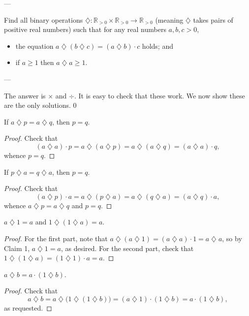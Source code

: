 
---

Find all binary operations $\mathbin{\diamondsuit}:\mathbb R_{>0}\times\mathbb R_{>0}\to\mathbb R_{>0}$ (meaning $\mathbin{\diamondsuit}$ takes pairs of positive real numbers) such that for any real numbers $a,b,c>0$,
\begin{itemize}[itemsep=0em]
    \item the equation $a\mathbin{\diamondsuit}(b\mathbin{\diamondsuit}c)=(a\mathbin{\diamondsuit}b)\cdot c$ holds; and
    \item if $a\ge 1$ then $a\mathbin{\diamondsuit}a\ge 1$.
\end{itemize}

---

The answer is $\times$ and $\div$. It is easy to check that these work. We now show these are the only solutions.
\setcounter{iclaim}0
\begin{iclaim}
    If $a\mathbin{\diamondsuit}p=a\mathbin{\diamondsuit}q$, then $p=q$.
\end{iclaim}
\begin{proof}
    Check that $$(a\mathbin{\diamondsuit}a)\cdot p=a\mathbin{\diamondsuit}(a\mathbin{\diamondsuit}p)=a\mathbin{\diamondsuit}(a\mathbin{\diamondsuit}q)=(a\mathbin{\diamondsuit}a)\cdot q,$$
    whence $p=q$.
\end{proof}
\begin{iclaim}
    If $p\mathbin{\diamondsuit}a=q\mathbin{\diamondsuit}a$, then $p=q$.
\end{iclaim}
\begin{proof}
    Check that $$(a\mathbin{\diamondsuit}p)\cdot a=a\mathbin{\diamondsuit}(p\mathbin{\diamondsuit}a)=a\mathbin{\diamondsuit}(q\mathbin{\diamondsuit}a)=(a\mathbin{\diamondsuit}q)\cdot a,$$
    whence $a\mathbin{\diamondsuit}p=a\mathbin{\diamondsuit}q$ and $p=q$.
\end{proof}
\begin{iclaim}
    $a\mathbin{\diamondsuit}1=a$ and $1\mathbin{\diamondsuit}(1\mathbin{\diamondsuit}a)=a$.
\end{iclaim}
\begin{proof}
    For the first part, note that $a\mathbin{\diamondsuit}(a\mathbin{\diamondsuit}1)=(a\mathbin{\diamondsuit}a)\cdot 1=a\mathbin{\diamondsuit}a$, so by Claim 1, $a\mathbin{\diamondsuit}1=a$, as desired. For the second part, check that $1\mathbin{\diamondsuit}(1\mathbin{\diamondsuit}a)=(1\mathbin{\diamondsuit}1)\cdot a=a$.
\end{proof}
\begin{iclaim}
    $a\mathbin{\diamondsuit}b=a\cdot(1\mathbin{\diamondsuit}b)$.
\end{iclaim}
\begin{proof}
    Check that $$a\mathbin{\diamondsuit}b=a\mathbin{\diamondsuit}\big(1\mathbin{\diamondsuit}(1\mathbin{\diamondsuit}b)\big)=(a\mathbin{\diamondsuit}1)\cdot(1\mathbin{\diamondsuit}b)=a\cdot(1\mathbin{\diamondsuit}b),$$
    as requested.
\end{proof}

